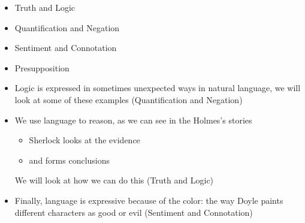 \documentclass[a4paper,landscape,headrule,footrule,xetex]{foils}
\begin{document}
\maketitle

%



\begin{itemize}
\item Truth and Logic
\item Quantification and Negation
\item Sentiment and Connotation
\item Presupposition
\end{itemize}




\begin{itemize}
\item Logic is expressed in sometimes unexpected ways in natural
  language, we will look at some of these examples (Quantification and Negation)
\item We use language to reason, as we can see in the Holmes's stories
  \begin{itemize}
  \item Sherlock looks at the evidence
  \item and forms conclusions
  \end{itemize}
  We will look at how we can do this (Truth and Logic)
\item Finally, language is expressive because of the
  color: the way Doyle paints different characters as good or evil
  (Sentiment and Connotation)
\end{itemize}




\end{document}
